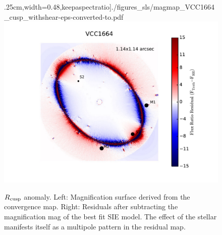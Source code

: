 \begin{itemize}
\begin{figure}
		.25cm,width=0.48\linewidth,keepaspectratio]{./figures_sls/magmap_VCC1664_cusp_withshear-eps-converted-to.pdf}
		\includegraphics[clip,trim=2.5cm .5cm 1cm
		.25cm,width=0.48\linewidth,keepaspectratio]{./figures_sls/res_map_VCC1664_cusp_withshear-eps-converted-to.pdf}
		\caption[Map of magnification residuals for mock lens VCC1664]{\label{fig:magmaps_VCC1664} $R_{\rm{cusp}}$ anomaly. Left: Magnification surface derived from the convergence map. Right: Residuals after subtracting the magnification mag of the best fit SIE model. The effect of the stellar manifests itself as a multipole pattern in the residual map.}
	\end{figure}

\end{itemize}
